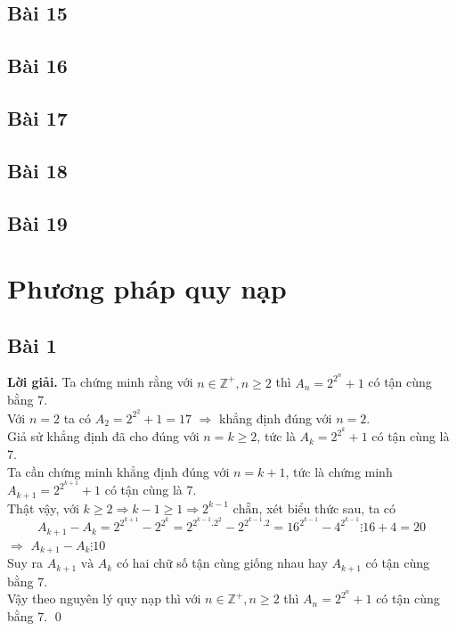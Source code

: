 \documentclass[a4paper,14pt]{article}
\begin{document}
    \subsection{Bài 15}

    \subsection{Bài 16}

    \subsection{Bài 17}

    \subsection{Bài 18}

    \subsection{Bài 19}

\section{Phương pháp quy nạp}
    \subsection{Bài 1}
        \textbf{Lời giải.}
            Ta chứng minh rằng với $ n\in\mathbb{Z}^+,n\geqslant 2$ thì $A_n=2^{2^n}+1$ có tận cùng bằng 7. \\
            Với $n=2$ ta có $A_2=2^{2^2}+1=17$ $\Rightarrow$ khẳng định đúng với $n=2$. \\
            Giả sử khẳng định đã cho đúng với $n=k\geqslant 2$, tức là $A_k=2^{2^k}+1$ có tận cùng là 7. \\
            Ta cần chứng minh khẳng định đúng với $n=k+1$, tức là chứng minh $A_{k+1}=2^{2^{k+1}}+1$ có tận cùng là 7. \\
            Thật vậy, với $k\geqslant 2 \Rightarrow k-1\geqslant 1 \Rightarrow 2^{k-1} \text{ chẵn}$, xét biểu thức sau, ta có
                \[
                    A_{k+1}-A_k=2^{2^{k+1}}-2^{2^k}=2^{2^{k-1}.2^2}-2^{2^{k-1}.2}=16^{2^{k-1}}-4^{2^{k-1}} \vdots 16+4=20
                \]
            $\Rightarrow$  $A_{k+1}-A_k\vdots 10$ \\
            Suy ra $A_{k+1} \text{ và } A_k$ có hai chữ số tận cùng giống nhau hay $A_{k+1}$ có tận cùng bằng 7.\\
            Vậy theo nguyên lý quy nạp thì với $ n\in\mathbb{Z}^+,n\geqslant 2$ thì $A_n=2^{2^n}+1$ có tận cùng bằng 7.
        \qed
\end{document}
